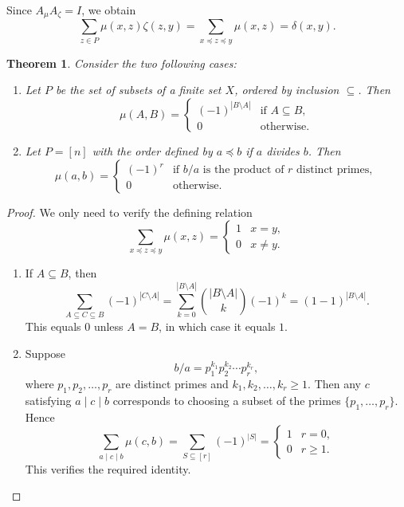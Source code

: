 \documentclass{amsart}
\numberwithin{equation}{section}
\theoremstyle{plain}
\newtheorem{theorem}{Theorem}[section]
\theoremstyle{definition}
\begin{document}
Since $A_{\mu}A_{\zeta}=I$, we obtain
\[
\sum_{z\in P}\mu(x,z)\zeta(z,y)
=
\sum_{x\preceq z\preceq y}\mu(x,z)
=
\delta(x,y).
\]

\begin{theorem}

Consider the two following cases:


\begin{enumerate}
\item[(a)] Let $P$ be the set of subsets of a finite set $X$, ordered by inclusion $\subseteq$. Then
\[
\mu(A,B)=
\begin{cases}
(-1)^{|B\setminus A|} & \text{if } A\subseteq B,\\
0 & \text{otherwise}.
\end{cases}
\]

\item[(b)] Let $P=[n]$ with the order defined by $a \preceq b$ if $a$ divides $b$. Then
\[
\mu(a,b)=
\begin{cases}
(-1)^r & \text{if } b/a \text{ is the product of } r \text{ distinct primes},\\
0 & \text{otherwise}.
\end{cases}
\]
\end{enumerate}
\end{theorem}

\begin{proof}
We only need to verify the defining relation
\[
\sum_{x \preceq z \preceq y} \mu(x,z) =
\begin{cases}
1 & x=y,\\
0 & x\ne y.
\end{cases}
\]

\begin{enumerate}
\item[(a)] If $A\subseteq B$, then
\[
\sum_{A\subseteq C\subseteq B} (-1)^{|C\setminus A|}
= \sum_{k=0}^{|B\setminus A|} \binom{|B\setminus A|}{k} (-1)^k
= (1-1)^{|B\setminus A|}.
\]
This equals $0$ unless $A=B$, in which case it equals $1$.

\item[(b)] Suppose
\[
b/a = p_1^{k_1}p_2^{k_2}\cdots p_r^{k_r},
\]
where $p_1,p_2,\ldots,p_r$ are distinct primes and $k_1,k_2,\ldots,k_r \ge 1$.
Then any $c$ satisfying $a\mid c\mid b$ corresponds to choosing a subset
of the primes $\{p_1,\ldots,p_r\}$. Hence
\[
\sum_{a\mid c\mid b} \mu(c,b)
= \sum_{S\subseteq [r]} (-1)^{|S|}
=
\begin{cases}
1 & r=0,\\
0 & r\ge 1.
\end{cases}
\]
This verifies the required identity.
\end{enumerate}
\end{proof}
\end{document}
